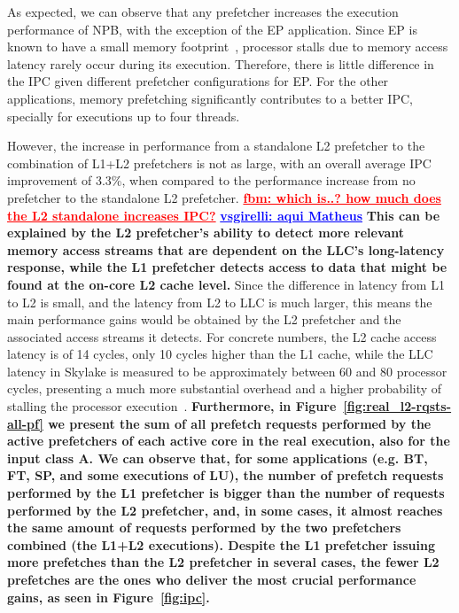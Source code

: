 \documentclass[AMA,final,STIX1COL]{WileyNJD-v2}
\newcommand\new[1]{{\color{red}\textbf{#1}}}
\newcommand{\vsg}[1]{\textcolor{blue}{\bfseries \ul{vsgirelli: #1} }\vspace{0.2cm}}
\newcommand{\fbm}[1]{\textcolor{red}{\bfseries \ul{fbm: #1} }\vspace{0.2cm}}
\begin{document}
As expected, we can observe that any prefetcher increases the execution performance of NPB, with the exception of the EP application. 
Since EP is known to have a small memory footprint~\cite{jin1999openmp}, processor stalls due to memory access latency rarely occur during its execution. 
Therefore, there is little difference in the IPC given different prefetcher configurations for EP. 
For the other applications, memory prefetching significantly contributes to a better IPC, specially for executions up to four threads.


However, the increase in performance from a standalone L2 prefetcher to the combination of L1+L2 prefetchers is not as large, with an overall average IPC improvement of 3.3\%, when compared to the performance increase from no prefetcher to the standalone L2 prefetcher. \fbm{which is..? how much does the L2 standalone increases IPC?}
\vsg{aqui Matheus}
\new{This can be explained by the L2 prefetcher's ability to detect more relevant memory access streams that are dependent on the LLC's long-latency response, while the L1 prefetcher detects access to data that might be found at the on-core L2 cache level.}
Since the difference in latency from L1 to L2 is small, and the latency from L2 to LLC is much larger, this means the main performance gains would be obtained by the L2 prefetcher and the associated access streams it detects.
For concrete numbers, the L2 cache access latency is of 14 cycles, only 10 cycles higher than the L1 cache, while the LLC latency in Skylake is measured to be approximately between 60 and 80 processor cycles, presenting a much more substantial overhead and a higher probability of stalling the processor execution~\cite{alves2015sinuca}. 
\new{Furthermore, in Figure~\ref{fig:real_l2-rqsts-all-pf} we present the sum of all prefetch requests performed by the active prefetchers of each active core in the real execution, also for the input class A.
We can observe that, for some applications (e.g. BT, FT, SP, and some executions of LU), the number of prefetch requests performed by the L1 prefetcher is bigger than the number of requests performed by the L2 prefetcher, and, in some cases, it almost reaches the same amount of requests performed by the two prefetchers combined (the L1+L2 executions).
Despite the L1 prefetcher issuing more prefetches than the L2 prefetcher in several cases, the fewer L2 prefetches are the ones who deliver the most crucial performance gains, as seen in Figure~\ref{fig:ipc}.}
\end{document}
